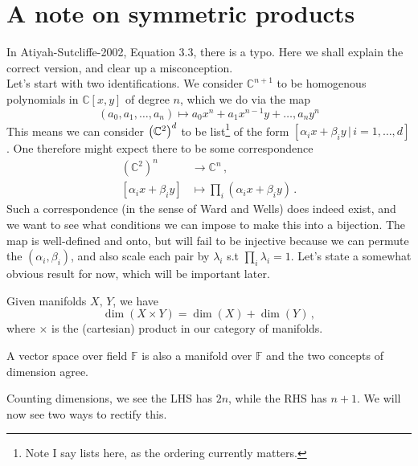 \documentclass{article}
\title{}
\author{Linden Disney-Hogg}
\date{}
\begin{document}
\maketitle
\tableofcontents

\section{A note on symmetric products}
In Atiyah-Sutcliffe-2002, Equation 3.3, there is a typo. Here we shall explain the correct version, and clear up a misconception. \\
Let's start with two identifications. We consider $\mathbb{C}^{n+1}$ to be homogenous polynomials in $\mathbb{C}[x,y]$ of degree $n$, which we do via the map
\[
(a_0, a_1, \dots, a_n) \mapsto a_0 x^n + a_1 x^{n-1}y + \dots , a_n y^n
\]
This means we can consider $\left( \mathbb{C}^2 \right)^d$ to be list\footnote{Note I say lists here, as the ordering currently matters.} of the form $[\alpha_i x + \beta_i y \, | \, i=1, \dots, d]$. One therefore might expect there to be some correspondence 
\begin{align*}
	(\mathbb{C}^2)^n &\to \mathbb{C}^n \, ,  \\
[\alpha_i x + \beta_i y] &\mapsto \prod_i (\alpha_i x + \beta_i y) \, .
\end{align*} 
Such a correspondence (in the sense of Ward and Wells) does indeed exist, and we want to see what conditions we can impose to make this into a bijection. The map is well-defined and onto, but will fail to be injective because we can permute the $(\alpha_i, \beta_i)$, and also scale each pair by $\lambda_i$ s.t $\prod_i \lambda_i =1$. Let's state a somewhat obvious result for now, which will be important later. 
\begin{lemma}
	Given manifolds $X, \, Y$, we have 
	\[
	\dim (X \times Y) = \dim (X) + \dim (Y) \, ,
	\]
	where $\times$ is the (cartesian) product in our category of manifolds. 
\end{lemma}
\begin{lemma}
	A vector space over field $\mathbb{F}$ is also a manifold over $\mathbb{F}$ and the two concepts of dimension agree.  
\end{lemma}
Counting dimensions, we see the LHS has $2n$, while the RHS has $n+1$. We will now see two ways to rectify this. 
\end{document}

